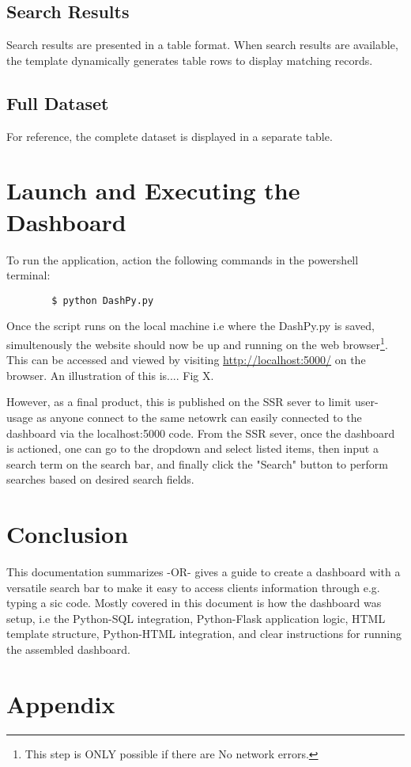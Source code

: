 \documentclass{article}
\begin{document}
	\subsection{Search Results}
	Search results are presented in a table format. When search results are available, the template dynamically generates table rows to display matching records.
	
	\subsection{Full Dataset}
	For reference, the complete dataset is displayed in a separate table.
	
	\section{Launch and Executing the Dashboard}
	To run the application, action the following commands in the powershell terminal:
	\begin{verbatim}
		$ python DashPy.py
	\end{verbatim}
	
	Once the script runs on the local machine i.e where the DashPy.py is saved, simultenously the website should now be up and running on the web browser\footnote{This step is ONLY possible if there are No network errors.}. This can be accessed and viewed by visiting \url{http://localhost:5000/} on the browser. An illustration of this is.... Fig X.
	
	
	
	However, as a final product, this is published on the  SSR sever to limit user-usage as anyone connect to the same netowrk can easily connected to the dashboard via the localhost:5000 code. From the SSR sever, once the dashboard is actioned, one can go to the dropdown and select listed items, then input a search term on the search bar, and finally click the "Search" button to perform searches based on desired search fields.
	
	\section{Conclusion}
	This documentation summarizes -OR- gives a guide to create a dashboard with a versatile search bar to make it easy to access clients information through e.g. typing a sic code. Mostly covered in this document is how the dashboard was setup, i.e the Python-SQL integration, Python-Flask application logic, HTML template structure, Python-HTML integration, and clear instructions for running the assembled dashboard.

\section{Appendix}
\label{Append:DashPython}
\end{document}
